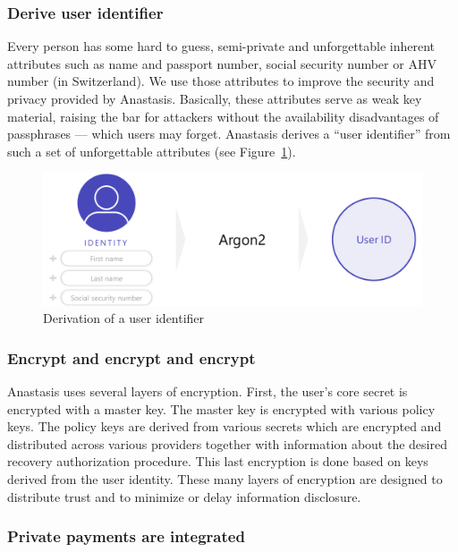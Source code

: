 \subsubsection*{Derive user identifier}

Every person has some hard to guess, semi-private and unforgettable
inherent attributes such as name and passport number, social security
number or AHV~\cite{jerome2015} number (in Switzerland).  We use those attributes to
improve the security and privacy provided by Anastasis.  Basically,
these attributes serve as weak key material, raising the bar for
attackers without the availability disadvantages of passphrases ---
which users may forget.  Anastasis derives a ``user identifier'' from
such a set of unforgettable attributes (see Figure~\ref{fig:user_id}).

\begin{figure}[H]
\centering
\includegraphics[scale=0.3]{images/user_id.png}
\caption{Derivation of a user identifier}
\label{fig:user_id}
\end{figure}

\subsubsection*{Encrypt and encrypt and encrypt}

Anastasis uses several layers of encryption. First, the user's core
secret is encrypted with a master key. The master key is encrypted
with various policy keys. The policy keys are derived from various
secrets which are encrypted and distributed across various providers
together with information about the desired recovery authorization
procedure. This last encryption is done based on keys derived from the
user identity.  These many layers of encryption are designed to
distribute trust and to minimize or delay information disclosure.

\subsubsection*{Private payments are integrated}

